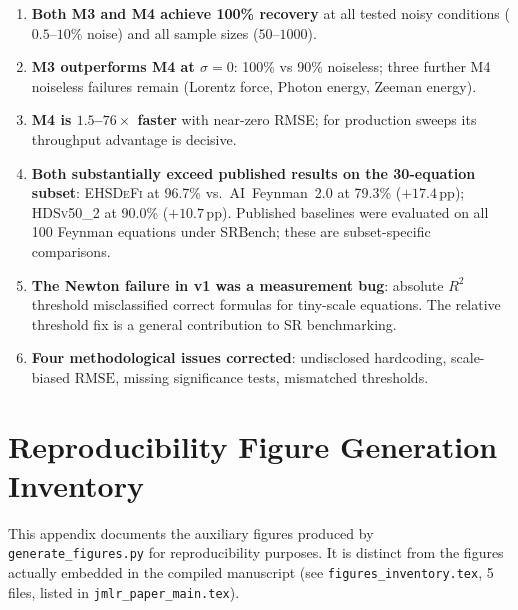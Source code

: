 \documentclass[twoside,11pt]{article}
\newcommand{\EHD}{\textsc{EHSDeFi}}
\newcommand{\HDS}{\textsc{HDSv50\_2}}
\newcommand{\Rsq}{R^{2}}
\newcommand{\rmse}{\ensuremath{\mathrm{RMSE}}}
\begin{document}
\begin{enumerate}
  \item \textbf{Both M3 and M4 achieve 100\% recovery} at all tested noisy
    conditions ($0.5$--$10\%$ noise) and all sample sizes ($50$--$1000$).
  \item \textbf{M3 outperforms M4 at $\sigma=0$}: 100\% vs 90\% noiseless;
    three further M4 noiseless failures remain (Lorentz force, Photon energy,
    Zeeman energy).
  \item \textbf{M4 is $1.5$--$76\times$ faster} with near-zero RMSE; for
    production sweeps its throughput advantage is decisive.
  \item \textbf{Both substantially exceed published results on the 30-equation subset}:
    \EHD{} at 96.7\% vs.\ AI~Feynman~2.0 at 79.3\% ($+17.4$\,pp); \HDS{}
    at 90.0\% ($+10.7$\,pp).  Published baselines were evaluated on all 100
    Feynman equations under SRBench; these are subset-specific comparisons.
  \item \textbf{The Newton failure in v1 was a measurement bug}: absolute
    $\Rsq$ threshold misclassified correct formulas for tiny-scale equations.
    The relative threshold fix is a general contribution to SR benchmarking.
  \item \textbf{Four methodological issues corrected}: undisclosed hardcoding,
    scale-biased \rmse, missing significance tests, mismatched thresholds.
\end{enumerate}



\appendix

\section{Reproducibility Figure Generation Inventory}
\label{app:figures}

\noindent This appendix documents the auxiliary figures produced by
\texttt{generate\_figures.py} for reproducibility purposes. It is
distinct from the figures actually embedded in the compiled
manuscript (see \texttt{figures\_inventory.tex}, 5 files, listed in
\texttt{jmlr\_paper\_main.tex}).
\end{document}
